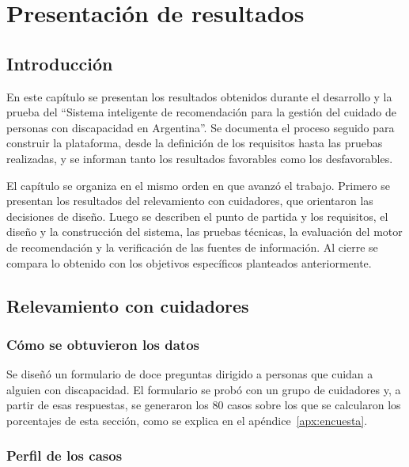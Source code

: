 
\chapter{Presentación de resultados}\label{cap:resultados}

\section{Introducción}

En este capítulo se presentan los resultados obtenidos durante el desarrollo y la prueba del ``Sistema inteligente de recomendación para la gestión del cuidado de personas con discapacidad en Argentina''. Se documenta el proceso seguido para construir la plataforma, desde la definición de los requisitos hasta las pruebas realizadas, y se informan tanto los resultados favorables como los desfavorables.

El capítulo se organiza en el mismo orden en que avanzó el trabajo. Primero se presentan los resultados del relevamiento con cuidadores, que orientaron las decisiones de diseño. Luego se describen el punto de partida y los requisitos, el diseño y la construcción del sistema, las pruebas técnicas, la evaluación del motor de recomendación y la verificación de las fuentes de información. Al cierre se compara lo obtenido con los objetivos específicos planteados anteriormente.

\section{Relevamiento con cuidadores}\label{sec:relevamiento}

\subsection{Cómo se obtuvieron los datos}

Se diseñó un formulario de doce preguntas dirigido a personas que cuidan a alguien con discapacidad. El formulario se probó con un grupo de cuidadores y, a partir de esas respuestas, se generaron los 80 casos sobre los que se calcularon los porcentajes de esta sección, como se explica en el apéndice~\ref{apx:encuesta}.

\subsection{Perfil de los casos}

